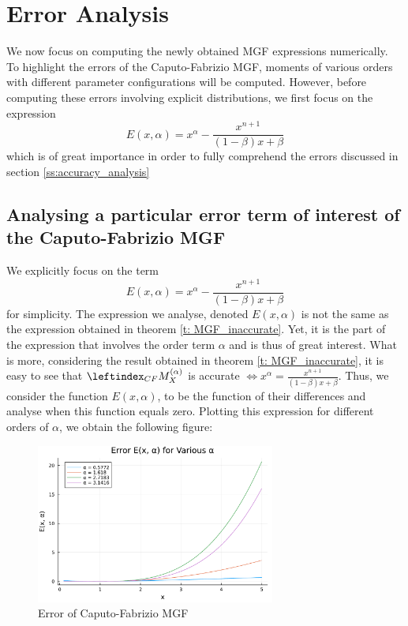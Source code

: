 \section{Error Analysis}\label{s:simulation}
We now focus on computing the newly obtained MGF expressions numerically. To highlight the errors of the Caputo-Fabrizio MGF, moments of various orders with different parameter configurations will be computed. However, before computing these errors involving explicit distributions, we first focus on the expression \[ E(x, \alpha) = x^\alpha - \displaystyle \frac{x^{n+1} }{(1 - \beta)x + \beta}\] which is of great importance in order to fully comprehend the errors discussed in section \ref{ss:accuracy_analysis}

\subsection{Analysing a particular error term of interest of the Caputo-Fabrizio MGF}
We explicitly focus on the term 
\begin{equation}\label{def:error} 
    E(x, \alpha) = x^\alpha - \displaystyle \frac{x^{n+1} }{(1 - \beta)x + \beta}
\end{equation}
 for simplicity. The expression we analyse, denoted \(E(x, \alpha)\) is not the same as the expression obtained in theorem \ref{t: MGF_inaccurate}. Yet, it is the part of the expression that involves the order term \(\alpha\) and is thus of great interest. What is more, considering the result obtained in theorem \ref{t: MGF_inaccurate}, it is easy to see that \(\leftindex_{CF}{M}_X^{(\alpha)}\) is accurate \(\iff x^\alpha = \displaystyle \frac{x^{n+1} }{(1 - \beta)x + \beta}\). Thus, we consider the function \(E(x, \alpha)\), to be the function of their differences and analyse when this function equals zero. Plotting this expression for different orders of \(\alpha\), we obtain the following figure:
\begin{figure}[H]
    \centering
    \includegraphics[width=0.7\textwidth]{figures/error_plot.pdf}
    \caption{Error of Caputo-Fabrizio MGF}
    \label{fig:error_MGF}
\end{figure}
